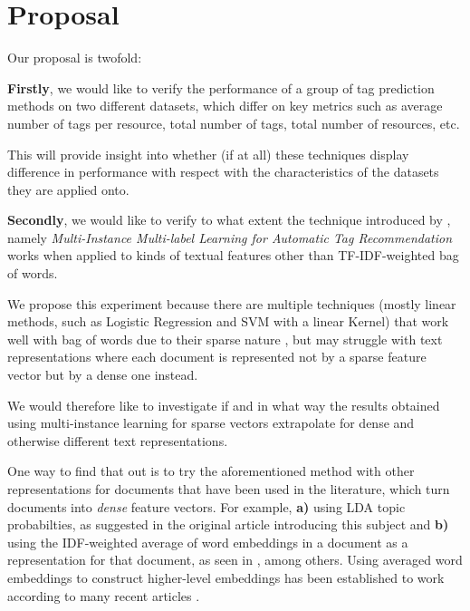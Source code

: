 \chapter{Proposal}\label{chap:proposal}

Our proposal is twofold:

\textbf{Firstly}, we would like to verify the performance of a group of tag prediction methods on two different datasets, which differ on key metrics such as average number of tags per resource, total number of tags, total number of resources, etc.

This will provide insight into whether (if at all)  these techniques display difference in performance with respect with the characteristics of the datasets they are applied onto.

\textbf{Secondly}, we would like to verify to what extent the technique introduced by \cite{shen_etal_2009}, namely \textit{Multi-Instance Multi-label Learning for Automatic Tag Recommendation} works when applied to kinds of textual features other than TF-IDF-weighted bag of words.

We propose this experiment because there are multiple techniques (mostly linear methods, such as Logistic Regression and SVM with a linear Kernel) that work well with bag of words due to their sparse nature \citep{hsu_etal_2010, li_etal_2015}, but may struggle with text representations where each document is represented not by a sparse feature vector but by a dense one instead.

We would therefore like to investigate if and in what way the results obtained using multi-instance learning for sparse vectors extrapolate for dense and otherwise different text representations.

One way to find that out is to try the aforementioned method with other representations for documents that have been used in the literature, which turn documents into \textit{dense} feature vectors. For example, \textbf{a)} using LDA topic probabilties, as suggested in the original article introducing this subject \citep{blei_etal_2003} and \textbf{b)} using the IDF-weighted average of word embeddings in a document as a representation for that document, as seen in \cite{zhao_etal_2015,correa_etal_2017}, among others. Using averaged word embeddings to construct higher-level embeddings has been established to work according to many recent articles \citep{wieting_etal_2016,arora_etal_2017}.